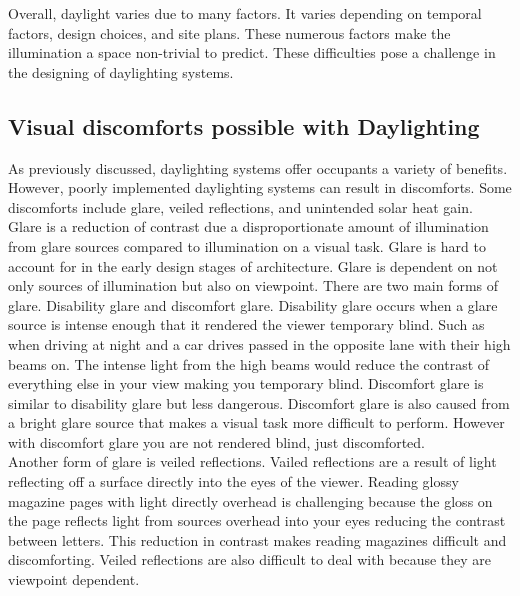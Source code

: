 		Overall, daylight varies due to many factors. It varies depending on temporal factors, design choices, and site plans. These numerous factors make the illumination a space non-trivial to predict. These difficulties pose a challenge in the designing of daylighting systems.

	\subsection{Visual discomforts possible with Daylighting}
		As previously discussed, daylighting systems offer occupants a variety of benefits.
		However, poorly implemented daylighting systems can result in discomforts. Some discomforts include glare, veiled reflections, and unintended solar heat gain. \\

		Glare is a reduction of contrast due a disproportionate amount of illumination from glare sources compared to illumination on a visual task.
		Glare is hard to account for in the early design stages of architecture. Glare is dependent on not only sources of illumination but also on viewpoint.
		There are two main forms of glare. Disability glare and discomfort glare.
		Disability glare occurs when a glare source is intense enough that it rendered the viewer temporary blind. Such as when driving at night and a car drives passed in the opposite lane with their high beams on. The intense light from the high beams would reduce the contrast of everything else in your view making you temporary blind.
		Discomfort glare is similar to disability glare but less dangerous. Discomfort glare is also caused from a bright glare source that makes a visual task more difficult to perform. However with discomfort glare you are not rendered blind, just discomforted. \\

		Another form of glare is veiled reflections.
		Vailed reflections are a result of light reflecting off a surface directly into the eyes of the viewer. Reading glossy magazine pages with light directly overhead is challenging because the gloss on the page reflects light from sources overhead into your eyes reducing the contrast between letters. This reduction in contrast makes reading magazines difficult and discomforting.
		Veiled reflections are also difficult to deal with because they are viewpoint dependent. \\

